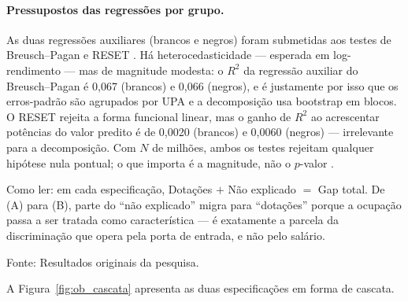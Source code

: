 \documentclass[11pt, a4paper, oneside]{article}
\begin{document}
\paragraph{Pressupostos das regressões por grupo.} As duas regressões auxiliares
(brancos e negros) foram submetidas aos testes de Breusch--Pagan e RESET
\cite[cap.~12]{favero2024}. Há heterocedasticidade --- esperada em log-rendimento ---
mas de magnitude modesta: o $R^2$ da regressão auxiliar do Breusch--Pagan é 0,067
(brancos) e 0,066 (negros), e é justamente por isso que os erros-padrão são
agrupados por UPA e a decomposição usa bootstrap em blocos. O RESET rejeita a forma
funcional linear, mas o ganho de $R^2$ ao acrescentar potências do valor predito é de
0,0020 (brancos) e 0,0060 (negros) --- irrelevante para a decomposição. Com $N$
de milhões, ambos os testes rejeitam qualquer hipótese nula pontual; o que importa é a
magnitude, não o $p$-valor \cite{angrist2009}.
\begin{table}[!ht]
\centering
\caption{Decomposição de Oaxaca--Blinder ({twofold}, referência: estrutura de preços
dos brancos) do gap salarial racial em duas especificações. (A)~{Capital humano +
contexto}: escolaridade, idade, sexo, jornada, área urbana, contexto de UPA e efeitos fixos
de UF --- os mesmos controles do HLM~M3; a parcela não explicada é comparável à da literatura.
(B)~{Acesso}: (A) + formalidade e grupo CBO tratados como dotações (os controles do M4) --- a parcela não explicada é a discriminação
{dentro} da ocupação, um limite inferior, pois a segregação ocupacional é ela própria
discriminatória \cite{oaxaca_ransom1999} (ver o GLMM de acesso, Tabela~\ref{tab:glmm_glassceil}).
População completa da PEA com renda positiva ($N = 7.699.278$; 41.459~UPAs).
Erros-padrão entre parênteses: bootstrap em blocos por UPA (500 réplicas).}
\label{tab:oaxaca_blinder}
\par\smallskip
\footnotesize{Como ler:} em cada especificação, Dotações $+$ Não explicado $=$ Gap total.
De (A) para (B), parte do ``não explicado'' migra para ``dotações'' porque a ocupação passa a
ser tratada como característica --- é exatamente a parcela da discriminação que opera pela
{porta de entrada}, e não pelo salário.
\par\smallskip\footnotesize Fonte: Resultados originais da pesquisa.
\end{table}
 A Figura~\ref{fig:ob_cascata} apresenta as duas especificações em forma de cascata.
\end{document}
